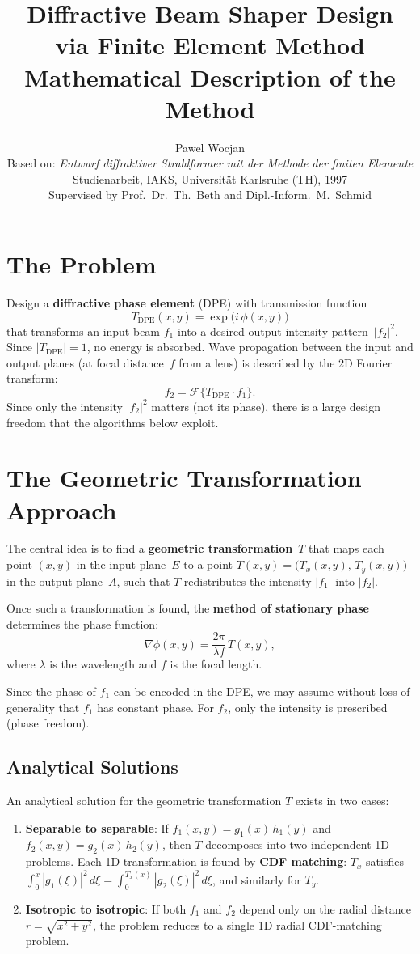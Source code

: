 \documentclass[11pt,a4paper]{article}
\title{Diffractive Beam Shaper Design\\via Finite Element Method\\[0.5em]
\large Mathematical Description of the Method}
\author{Pawel Wocjan\\[0.3em]
\small Based on: \emph{Entwurf diffraktiver Strahlformer mit der Methode der finiten Elemente}\\
\small Studienarbeit, IAKS, Universit\"at Karlsruhe (TH), 1997\\
\small Supervised by Prof.\ Dr.\ Th.\ Beth and Dipl.-Inform.\ M.\ Schmid}
\date{}
\begin{document}
\maketitle

\section{The Problem}

Design a \textbf{diffractive phase element} (DPE) with transmission function
\[
  T_{\mathrm{DPE}}(x,y) = \exp\bigl(i\,\phi(x,y)\bigr)
\]
that transforms an input beam $f_1$ into a desired output intensity pattern~$|f_2|^2$.
Since $|T_{\mathrm{DPE}}|=1$, no energy is absorbed.
Wave propagation between the input and output planes (at focal distance~$f$ from a lens) 
is described by the 2D Fourier transform:
\[
  f_2 = \mathcal{F}\bigl\{T_{\mathrm{DPE}} \cdot f_1\bigr\}.
\]
Since only the intensity $|f_2|^2$ matters (not its phase), 
there is a large design freedom that the algorithms below exploit.

\section{The Geometric Transformation Approach}

The central idea is to find a \textbf{geometric transformation}~$T$ 
that maps each point $(x,y)$ in the input plane~$E$ to a point 
$T(x,y) = \bigl(T_x(x,y),\, T_y(x,y)\bigr)$ in the output plane~$A$, 
such that $T$ redistributes the intensity $|f_1|$ into $|f_2|$.

Once such a transformation is found, the \textbf{method of stationary phase} 
determines the phase function:
\[
  \nabla\phi(x,y) = \frac{2\pi}{\lambda f}\, T(x,y),
\]
where $\lambda$ is the wavelength and $f$ is the focal length.

Since the phase of $f_1$ can be encoded in the DPE, we may assume without loss 
of generality that $f_1$ has constant phase. For $f_2$, only the intensity is 
prescribed (phase freedom).

\subsection{Analytical Solutions}

An analytical solution for the geometric transformation $T$ exists in two cases:
\begin{enumerate}
  \item \textbf{Separable to separable}: If $f_1(x,y)=g_1(x)\,h_1(y)$ and 
    $f_2(x,y)=g_2(x)\,h_2(y)$, then $T$ decomposes into two independent 1D problems.
    Each 1D transformation is found by \textbf{CDF matching}: 
    $T_x$ satisfies $\int_0^x |g_1(\xi)|^2\,d\xi = \int_0^{T_x(x)} |g_2(\xi)|^2\,d\xi$,
    and similarly for $T_y$.
  \item \textbf{Isotropic to isotropic}: If both $f_1$ and $f_2$ depend only on 
    the radial distance $r = \sqrt{x^2+y^2}$, the problem reduces to a single 1D 
    radial CDF-matching problem.
\end{enumerate}
\end{document}
